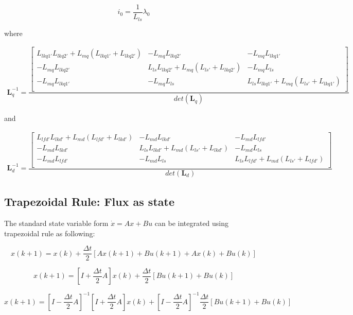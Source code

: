 \begin{equation}
  i_0  =\dfrac{1}{ L_{ls}} \lambda_{0}
\end{equation}

where

\begin{align}
\mathbf{L}_q^{-1} =
\dfrac{
\begin{bmatrix}
	L_{lkq1'} L_{lkq2'} + L_{mq}(L_{lkq1'} + L_{lkq2'}) & - L_{mq} L_{lkq2'} & -L_{mq} L_{lkq1'} \\
	- L_{mq} L_{lkq2'} & L_{ls} L_{lkq2'} + L_{mq}(L_{ls'} + L_{lkq2'}) & - L_{mq} L_{ls} \\
	-L_{mq} L_{lkq1'} &- L_{mq} L_{ls} &L_{ls} L_{lkq1'} + L_{mq}(L_{ls'} + L_{lkq1'}) \\
  \end{bmatrix}
}
{det(\mathbf{L}_q)}
\end{align}

and

\begin{align}
\mathbf{L}_d^{-1} =
\dfrac{
\begin{bmatrix}
	L_{lfd'} L_{lkd'} + L_{md}(L_{lfd'} + L_{lkd'}) & - L_{md} L_{lkd'} & -L_{md} L_{lfd'} \\
	- L_{md} L_{lkd'} & L_{ls} L_{lkd'} + L_{md}(L_{ls'} + L_{lkd'}) & - L_{md} L_{ls} \\
	-L_{md} L_{lfd'} &- L_{md} L_{ls} &L_{ls} L_{lfd'} + L_{md}(L_{ls'} + L_{lfd'}) \\
  \end{bmatrix}
}
{det(\mathbf{L}_d)}
\end{align}

\subsection{Trapezoidal Rule: Flux as state}
The standard state variable form $ \dot{x} = Ax + Bu $ can be integrated using trapezoidal rule as following:

\begin{equation}
x(k+1) = x(k) + \frac{\Delta t}{2} [Ax(k+1) + Bu(k+1) + Ax(k) + Bu(k)]
\end{equation}

\begin{equation}
[I - \frac{\Delta t}{2} A]x(k+1)  = [I + \frac{\Delta t}{2} A] x(k) + \frac{\Delta t}{2} [Bu(k+1) + Bu(k)]
\end{equation}

\begin{equation}
x(k+1)  = [I - \frac{\Delta t}{2} A]^{-1}[I + \frac{\Delta t}{2} A] x(k) + [I - \frac{\Delta t}{2} A]^{-1}\frac{\Delta t}{2} [Bu(k+1) + Bu(k)]
\end{equation}

